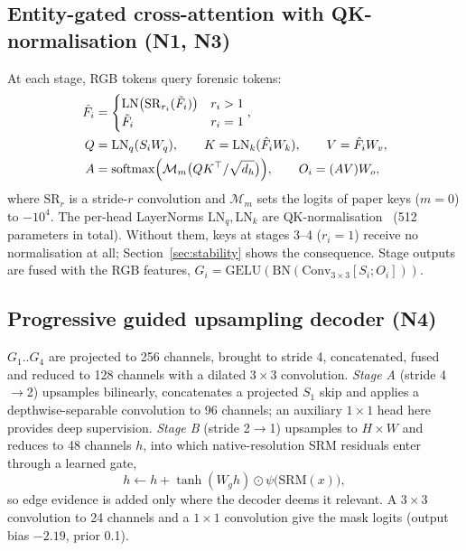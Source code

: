 \documentclass[11pt,a4paper]{article}
\begin{document}
\subsection{Entity-gated cross-attention with QK-normalisation (N1, N3)}\label{sec:xattn}
At each stage, RGB tokens query forensic tokens:
\begin{align}
\hat F_i &= \begin{cases}\mathrm{LN}\bigl(\mathrm{SR}_{r_i}(\tilde F_i)\bigr) & r_i>1\\ \tilde F_i & r_i=1\end{cases},\\
Q &= \mathrm{LN}_q(S_iW_q),\qquad K=\mathrm{LN}_k(\hat F_iW_k),\qquad V=\hat F_iW_v,\\
A &= \operatorname{softmax}\Bigl(\mathcal{M}_{m}\bigl(QK^{\top}/\sqrt{d_h}\bigr)\Bigr),\qquad O_i=(AV)W_o,
\end{align}
where $\mathrm{SR}_r$ is a stride-$r$ convolution and $\mathcal{M}_m$ sets the logits of paper
keys ($m=0$) to $-10^{4}$. The per-head LayerNorms $\mathrm{LN}_q,\mathrm{LN}_k$ are
QK-normalisation~\cite{qknorm} (512 parameters in total). Without them, keys at stages 3--4
($r_i=1$) receive no normalisation at all; Section~\ref{sec:stability} shows the consequence.
Stage outputs are fused with the RGB features,
$G_i=\mathrm{GELU}(\mathrm{BN}(\mathrm{Conv}_{3\times3}[S_i;O_i]))$.

\subsection{Progressive guided upsampling decoder (N4)}\label{sec:pgu}
$G_1..G_4$ are projected to 256 channels, brought to stride 4, concatenated, fused and reduced
to 128 channels with a dilated $3\times3$ convolution. \emph{Stage A} (stride 4$\rightarrow$2)
upsamples bilinearly, concatenates a projected $S_1$ skip and applies a depthwise-separable
convolution to 96 channels; an auxiliary $1\times1$ head here provides deep supervision.
\emph{Stage B} (stride 2$\rightarrow$1) upsamples to $H\times W$ and reduces to 48 channels
$h$, into which native-resolution SRM residuals enter through a learned gate,
\begin{equation}
h\leftarrow h+\tanh(W_g h)\odot\psi\bigl(\mathrm{SRM}(x)\bigr),
\end{equation}
so edge evidence is added only where the decoder deems it relevant. A $3\times3$ convolution to
24 channels and a $1\times1$ convolution give the mask logits (output bias $-2.19$, prior 0.1).
\end{document}
